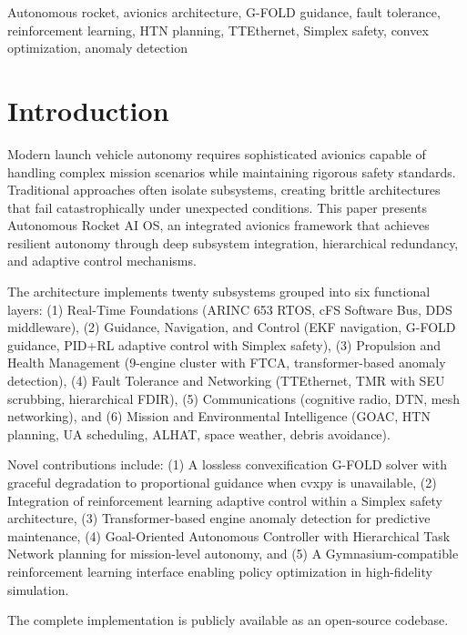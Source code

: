 \documentclass[10pt, conference, compsocconf]{IEEEtran}
\begin{document}
\begin{IEEEkeywords}
Autonomous rocket, avionics architecture, G-FOLD guidance, fault tolerance, reinforcement learning, HTN planning, TTEthernet, Simplex safety, convex optimization, anomaly detection
\end{IEEEkeywords}

\section{Introduction}
\label{sec:introduction}

Modern launch vehicle autonomy requires sophisticated avionics capable of handling complex mission scenarios while maintaining rigorous safety standards\cite{cziklovszki2020avionics}. Traditional approaches often isolate subsystems, creating brittle architectures that fail catastrophically under unexpected conditions. This paper presents Autonomous Rocket AI OS, an integrated avionics framework that achieves resilient autonomy through deep subsystem integration, hierarchical redundancy, and adaptive control mechanisms.

The architecture implements twenty subsystems grouped into six functional layers: (1) Real-Time Foundations (ARINC 653 RTOS, cFS Software Bus, DDS middleware), (2) Guidance, Navigation, and Control (EKF navigation, G-FOLD guidance, PID+RL adaptive control with Simplex safety), (3) Propulsion and Health Management (9-engine cluster with FTCA, transformer-based anomaly detection), (4) Fault Tolerance and Networking (TTEthernet, TMR with SEU scrubbing, hierarchical FDIR), (5) Communications (cognitive radio, DTN, mesh networking), and (6) Mission and Environmental Intelligence (GOAC, HTN planning, UA scheduling, ALHAT, space weather, debris avoidance).

Novel contributions include: (1) A lossless convexification G-FOLD solver with graceful degradation to proportional guidance when cvxpy is unavailable\cite{acikmese2007convex}\cite{blackmore2010minimum}, (2) Integration of reinforcement learning adaptive control within a Simplex safety architecture\cite{seto2025use}, (3) Transformer-based engine anomaly detection for predictive maintenance\cite{lee2019deep}, (4) Goal-Oriented Autonomous Controller with Hierarchical Task Network planning for mission-level autonomy\cite{zhang2024spacecraft}, and (5) A Gymnasium-compatible reinforcement learning interface enabling policy optimization in high-fidelity simulation\cite{kim2021deep}.

The complete implementation is publicly available as an open-source codebase\cite{rocketoscodebase}.
\end{document}
